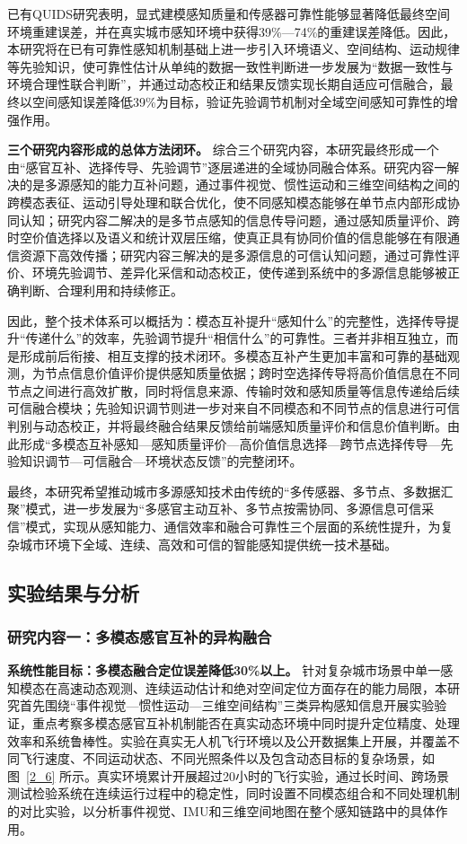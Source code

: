 已有QUIDS研究表明，显式建模感知质量和传感器可靠性能够显著降低最终空间环境重建误差，并在真实城市感知环境中获得39\%—74\%的重建误差降低。因此，本研究将在已有可靠性感知机制基础上进一步引入环境语义、空间结构、运动规律等先验知识，使可靠性估计从单纯的数据一致性判断进一步发展为“数据一致性与环境合理性联合判断”，并通过动态校正和结果反馈实现长期自适应可信融合，最终以空间感知误差降低39\%为目标，验证先验调节机制对全域空间感知可靠性的增强作用。

\textbf{三个研究内容形成的总体方法闭环。}
综合三个研究内容，本研究最终形成一个由“感官互补、选择传导、先验调节”逐层递进的全域协同融合体系。研究内容一解决的是多源感知的能力互补问题，通过事件视觉、惯性运动和三维空间结构之间的跨模态表征、运动引导处理和联合优化，使不同感知模态能够在单节点内部形成协同认知；研究内容二解决的是多节点感知的信息传导问题，通过感知质量评价、跨时空价值选择以及语义和统计双层压缩，使真正具有协同价值的信息能够在有限通信资源下高效传播；研究内容三解决的是多源信息的可信认知问题，通过可靠性评价、环境先验调节、差异化采信和动态校正，使传递到系统中的多源信息能够被正确判断、合理利用和持续修正。

因此，整个技术体系可以概括为：模态互补提升“感知什么”的完整性，选择传导提升“传递什么”的效率，先验调节提升“相信什么”的可靠性。三者并非相互独立，而是形成前后衔接、相互支撑的技术闭环。多模态互补产生更加丰富和可靠的基础观测，为节点信息价值评价提供感知质量依据；跨时空选择传导将高价值信息在不同节点之间进行高效扩散，同时将信息来源、传输时效和感知质量等信息传递给后续可信融合模块；先验知识调节则进一步对来自不同模态和不同节点的信息进行可信判别与动态校正，并将最终融合结果反馈给前端感知质量评价和信息价值判断。由此形成“多模态互补感知—感知质量评价—高价值信息选择—跨节点选择传导—先验知识调节—可信融合—环境状态反馈”的完整闭环。

最终，本研究希望推动城市多源感知技术由传统的“多传感器、多节点、多数据汇聚”模式，进一步发展为“多感官主动互补、多节点按需协同、多源信息可信采信”模式，实现从感知能力、通信效率和融合可靠性三个层面的系统性提升，为复杂城市环境下全域、连续、高效和可信的智能感知提供统一技术基础。


\subsection{实验结果与分析}

\subsubsection{研究内容一：多模态感官互补的异构融合}

\textbf{系统性能目标：多模态融合定位误差降低30\%以上。}
针对复杂城市场景中单一感知模态在高速动态观测、连续运动估计和绝对空间定位方面存在的能力局限，本研究首先围绕“事件视觉—惯性运动—三维空间结构”三类异构感知信息开展实验验证，重点考察多模态感官互补机制能否在真实动态环境中同时提升定位精度、处理效率和系统鲁棒性。实验在真实无人机飞行环境以及公开数据集上开展，并覆盖不同飞行速度、不同运动状态、不同光照条件以及包含动态目标的复杂场景，如图~\ref{2_6} 所示。真实环境累计开展超过20小时的飞行实验，通过长时间、跨场景测试检验系统在连续运行过程中的稳定性，同时设置不同模态组合和不同处理机制的对比实验，以分析事件视觉、IMU和三维空间地图在整个感知链路中的具体作用。

